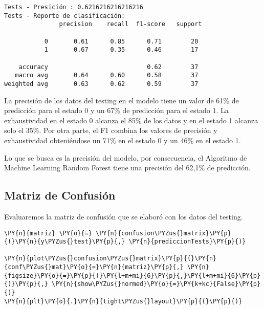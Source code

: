     \begin{Verbatim}[commandchars=\\\{\}]
Tests - Presición : 0.6216216216216216
Tests - Reporte de clasificación:
               precision    recall  f1-score   support

           0       0.61      0.85      0.71        20
           1       0.67      0.35      0.46        17

    accuracy                           0.62        37
   macro avg       0.64      0.60      0.58        37
weighted avg       0.63      0.62      0.59        37

    \end{Verbatim}

    La precisión de los datos del testing en el modelo tiene un valor de
61\% de predicción para el estado 0 y un 67\% de predicción para el
estado 1. La exhaustividad en el estado 0 alcanza el 85\% de los datos y
en el estado 1 alcanza solo el 35\%. Por otra parte, el F1 combina los
valores de precisión y exhaustividad obteniéndose un 71\% en el estado 0
y un 46\% en el estado 1.

Lo que se busca es la precisión del modelo, por consecuencia, el
Algoritmo de Machine Learning Random Forest tiene una precisión del
62,1\% de predicción.

    \hypertarget{matriz-de-confusiuxf3n}{%
\subsection{Matriz de Confusión}\label{matriz-de-confusiuxf3n}}

Evaluaremos la matriz de confusión que se elaboró con los datos del
testing.

    \begin{tcolorbox}[breakable, size=fbox, boxrule=1pt, pad at break*=1mm,colback=cellbackground, colframe=cellborder]
\begin{Verbatim}[commandchars=\\\{\}]
\PY{n}{matriz} \PY{o}{=} \PY{n}{confusion\PYZus{}matrix}\PY{p}{(}\PY{n}{y\PYZus{}test}\PY{p}{,} \PY{n}{prediccionTests}\PY{p}{)}

\PY{n}{plot\PYZus{}confusion\PYZus{}matrix}\PY{p}{(}\PY{n}{conf\PYZus{}mat}\PY{o}{=}\PY{n}{matriz}\PY{p}{,} \PY{n}{figsize}\PY{o}{=}\PY{p}{(}\PY{l+m+mi}{6}\PY{p}{,}\PY{l+m+mi}{6}\PY{p}{)}\PY{p}{,} \PY{n}{show\PYZus{}normed}\PY{o}{=}\PY{k+kc}{False}\PY{p}{)}
\PY{n}{plt}\PY{o}{.}\PY{n}{tight\PYZus{}layout}\PY{p}{(}\PY{p}{)}
\end{Verbatim}
\end{tcolorbox}

